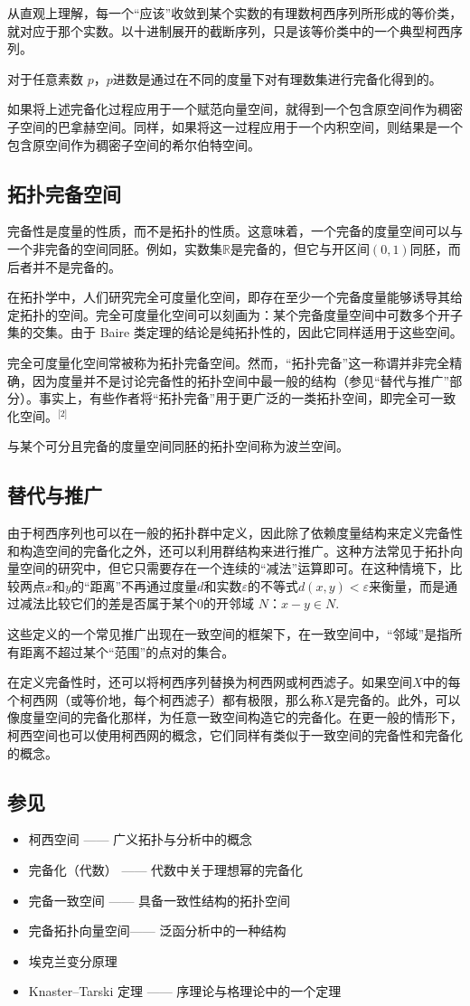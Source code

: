 从直观上理解，每一个“应该”收敛到某个实数的有理数柯西序列所形成的等价类，就对应于那个实数。以十进制展开的截断序列，只是该等价类中的一个典型柯西序列。

对于任意素数 $p$，$p$进数是通过在不同的度量下对有理数集进行完备化得到的。

如果将上述完备化过程应用于一个赋范向量空间，就得到一个包含原空间作为稠密子空间的巴拿赫空间。同样，如果将这一过程应用于一个内积空间，则结果是一个包含原空间作为稠密子空间的希尔伯特空间。
\subsection{拓扑完备空间}
完备性是度量的性质，而不是拓扑的性质。这意味着，一个完备的度量空间可以与一个非完备的空间同胚。例如，实数集$\mathbb{R}$是完备的，但它与开区间$(0,1)$同胚，而后者并不是完备的。

在拓扑学中，人们研究完全可度量化空间，即存在至少一个完备度量能够诱导其给定拓扑的空间。完全可度量化空间可以刻画为：某个完备度量空间中可数多个开子集的交集。由于 Baire 类定理的结论是纯拓扑性的，因此它同样适用于这些空间。

完全可度量化空间常被称为拓扑完备空间。然而，“拓扑完备”这一称谓并非完全精确，因为度量并不是讨论完备性的拓扑空间中最一般的结构（参见“替代与推广”部分）。事实上，有些作者将“拓扑完备”用于更广泛的一类拓扑空间，即完全可一致化空间。\(^\text{[2]}\)

与某个可分且完备的度量空间同胚的拓扑空间称为波兰空间。
\subsection{替代与推广}
由于柯西序列也可以在一般的拓扑群中定义，因此除了依赖度量结构来定义完备性和构造空间的完备化之外，还可以利用群结构来进行推广。这种方法常见于拓扑向量空间的研究中，但它只需要存在一个连续的“减法”运算即可。在这种情境下，比较两点$x$和$y$的“距离”不再通过度量$d$和实数$\varepsilon$的不等式$d(x, y)<\varepsilon$来衡量，而是通过减法比较它们的差是否属于某个$0$的开邻域 $N$：$x - y \in N$.

这些定义的一个常见推广出现在一致空间的框架下，在一致空间中，“邻域”是指所有距离不超过某个“范围”的点对的集合。

在定义完备性时，还可以将柯西序列替换为柯西网或柯西滤子。如果空间$X$中的每个柯西网（或等价地，每个柯西滤子）都有极限，那么称$X$是完备的。此外，可以像度量空间的完备化那样，为任意一致空间构造它的完备化。在更一般的情形下，柯西空间也可以使用柯西网的概念，它们同样有类似于一致空间的完备性和完备化的概念。
\subsection{参见}
\begin{itemize}
\item 柯西空间 —— 广义拓扑与分析中的概念
\item 完备化（代数） —— 代数中关于理想幂的完备化
\item 完备一致空间 —— 具备一致性结构的拓扑空间
\item 完备拓扑向量空间—— 泛函分析中的一种结构
\item 埃克兰变分原理
\item Knaster–Tarski 定理 —— 序理论与格理论中的一个定理
\end{itemize}
